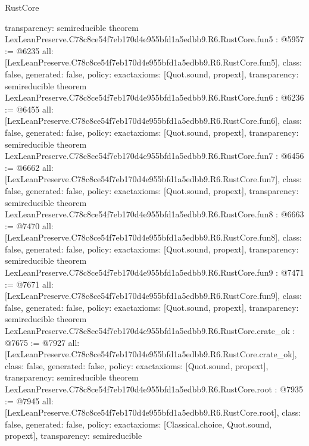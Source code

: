 \begin{lexlean}{RustCore}
\begin{coremodule}
{  transparency: semireducible
}
theorem LexLeanPreserve.C78c8ce54f7eb170d4e955bfd1a5edbb9.R6.RustCore.fun5 : @5957 := @6235 {
  all: [LexLeanPreserve.C78c8ce54f7eb170d4e955bfd1a5edbb9.R6.RustCore.fun5],
  class: false,
  generated: false,
  policy: exact{axioms: [Quot.sound, propext]},
  transparency: semireducible
}
theorem LexLeanPreserve.C78c8ce54f7eb170d4e955bfd1a5edbb9.R6.RustCore.fun6 : @6236 := @6455 {
  all: [LexLeanPreserve.C78c8ce54f7eb170d4e955bfd1a5edbb9.R6.RustCore.fun6],
  class: false,
  generated: false,
  policy: exact{axioms: [Quot.sound, propext]},
  transparency: semireducible
}
theorem LexLeanPreserve.C78c8ce54f7eb170d4e955bfd1a5edbb9.R6.RustCore.fun7 : @6456 := @6662 {
  all: [LexLeanPreserve.C78c8ce54f7eb170d4e955bfd1a5edbb9.R6.RustCore.fun7],
  class: false,
  generated: false,
  policy: exact{axioms: [Quot.sound, propext]},
  transparency: semireducible
}
theorem LexLeanPreserve.C78c8ce54f7eb170d4e955bfd1a5edbb9.R6.RustCore.fun8 : @6663 := @7470 {
  all: [LexLeanPreserve.C78c8ce54f7eb170d4e955bfd1a5edbb9.R6.RustCore.fun8],
  class: false,
  generated: false,
  policy: exact{axioms: [Quot.sound, propext]},
  transparency: semireducible
}
theorem LexLeanPreserve.C78c8ce54f7eb170d4e955bfd1a5edbb9.R6.RustCore.fun9 : @7471 := @7671 {
  all: [LexLeanPreserve.C78c8ce54f7eb170d4e955bfd1a5edbb9.R6.RustCore.fun9],
  class: false,
  generated: false,
  policy: exact{axioms: [Quot.sound, propext]},
  transparency: semireducible
}
theorem LexLeanPreserve.C78c8ce54f7eb170d4e955bfd1a5edbb9.R6.RustCore.crate_ok : @7675 := @7927 {
  all: [LexLeanPreserve.C78c8ce54f7eb170d4e955bfd1a5edbb9.R6.RustCore.crate_ok],
  class: false,
  generated: false,
  policy: exact{axioms: [Quot.sound, propext]},
  transparency: semireducible
}
theorem LexLeanPreserve.C78c8ce54f7eb170d4e955bfd1a5edbb9.R6.RustCore.root : @7935 := @7945 {
  all: [LexLeanPreserve.C78c8ce54f7eb170d4e955bfd1a5edbb9.R6.RustCore.root],
  class: false,
  generated: false,
  policy: exact{axioms: [Classical.choice, Quot.sound, propext]},
  transparency: semireducible
}


\end{coremodule}
\end{lexlean}
